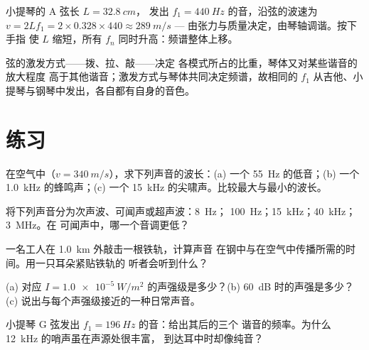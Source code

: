 \begin{example}[小提琴的 A 弦]\label{ex:g12:sound-acoustics:violin}
小提琴的 A 弦长 $L = \qty{32.8}{cm}$，
发出 $f_1 = \qty{440}{Hz}$ 的音，沿弦的波速为
$v = 2Lf_1 = 2 \times 0.328 \times 440 \approx \qty{289}{m/s}$ ---
由张力与质量决定，由琴轴调谐。按下手指
使 $L$ 缩短，所有 $f_n$ 同时升高：频谱整体上移。
\end{example}

\begin{remark}[乐器为何不同]\label{rem:g12:sound-acoustics:instruments}
弦的激发方式——拨、拉、敲——决定
各模式所占的比重，琴体又对某些谐音的放大程度
高于其他谐音；激发方式与琴体共同决定频谱，故相同的
$f_1$ 从吉他、小提琴与钢琴中发出，各自都有自身的音色。
\end{remark}

\section{练习}

\begin{exercise}[$\star$]\label{exo:g12:sound-acoustics:1}
在空气中（$v = \qty{340}{m/s}$），求下列声音的波长：(a) 一个
\qty{55}{Hz} 的低音；(b) 一个 \qty{1.0}{kHz} 的蜂鸣声；(c) 一个
\qty{15}{kHz} 的尖啸声。比较最大与最小的波长。
\end{exercise}

\begin{exercise}[$\star$]\label{exo:g12:sound-acoustics:2}
将下列声音分为次声波、可闻声或超声波：\qty{8}{Hz}；
\qty{100}{Hz}；\qty{15}{kHz}；\qty{40}{kHz}；\qty{3}{MHz}。在
可闻声中，哪一个音调更低？
\end{exercise}

\begin{exercise}[$\star$]\label{exo:g12:sound-acoustics:3}
一名工人在 \qty{1.0}{km} 外敲击一根铁轨，计算声音
在钢中与在空气中传播所需的时间。用一只耳朵紧贴铁轨的
听者会听到什么？
\end{exercise}

\begin{exercise}[$\star$]\label{exo:g12:sound-acoustics:4}
(a) 对应 $I = \qty{1.0e-5}{W/m^2}$ 的声强级是多少？(b)
\qty{60}{dB} 时的声强是多少？(c) 说出与每个声强级接近的一种日常声音。
\end{exercise}

\begin{exercise}[$\star$]\label{exo:g12:sound-acoustics:5}
小提琴 G 弦发出 $f_1 = \qty{196}{Hz}$ 的音：给出其后的三个
谐音的频率。为什么 \qty{12}{kHz} 的哨声虽在声源处很丰富，
到达耳中时却像纯音？
\end{exercise}

